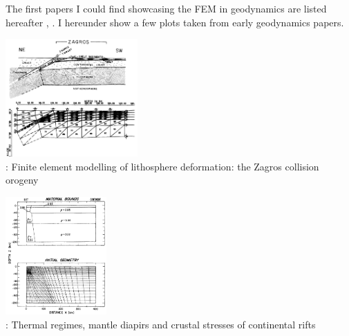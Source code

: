 
The first papers I could find showcasing the FEM in geodynamics are listed hereafter
\cite{gart78}, 
\cite{anbr80}\cite{mera80}\cite{bran80}
\cite{engl82}
\cite{thar85}
\cite{enho86}\cite{mofr86}
\cite{zupa86}
\cite{boww89}
\cite{brau94}
\cite{brbe95}.
I hereunder show a few plots taken from early geodynamics papers.


\begin{center}
\begin{minipage}{0.45\textwidth}
\centering
\includegraphics[height=4.5cm]{images/history/bird78b}\\
{: Finite element modelling of lithosphere deformation: the Zagros collision 
orogeny \cite{bird78b}}
\end{minipage}\hfill
\begin{minipage}{0.45\textwidth}
\centering
\includegraphics[height=4.5cm]{images/history/brpo81}\\
{: Thermal regimes, mantle diapirs and crustal stresses of continental rifts \cite{brpo81}}
\end{minipage}
\end{center}


